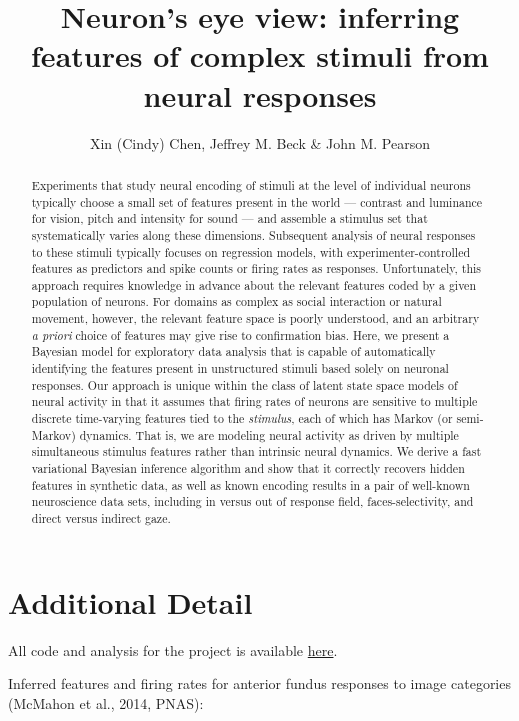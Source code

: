 \documentclass[12pt]{article}
\title{Neuron's eye view: inferring features of complex stimuli from neural responses}
\author{Xin (Cindy) Chen, Jeffrey M. Beck & John M. Pearson}
\date{}
\begin{document}
\maketitle

\begin{abstract}
    Experiments that study neural encoding of stimuli at the level of individual neurons typically choose a small set of features present in the world --- contrast and luminance for vision, pitch and intensity for sound --- and assemble a stimulus set that systematically varies along these dimensions. Subsequent analysis of neural responses to these stimuli typically focuses on regression models, with experimenter-controlled features as predictors and spike counts or firing rates as responses. Unfortunately, this approach requires knowledge in advance about the relevant features coded by a given population of neurons. For domains as complex as social interaction or natural movement, however, the relevant feature space is poorly understood, and an arbitrary \emph{a priori} choice of features may give rise to confirmation bias. Here, we present a Bayesian model for exploratory data analysis that is capable of automatically identifying the features present in unstructured stimuli based solely on neuronal responses. Our approach is unique within the class of latent state space models of neural activity in that it assumes that firing rates of neurons are sensitive to multiple discrete time-varying features tied to the \emph{stimulus}, each of which has Markov (or semi-Markov) dynamics. That is, we are modeling neural activity as driven by multiple simultaneous stimulus features rather than intrinsic neural dynamics.  We derive a fast variational Bayesian inference algorithm and show that it correctly recovers hidden features in synthetic data, as well as known encoding results in a pair of well-known neuroscience data sets, including in versus out of response field, faces-selectivity, and direct versus indirect gaze.
\end{abstract}

\section*{Additional Detail}

All code and analysis for the project is available \href{https://github.com/pearsonlab/spiketopics}{here}.

\vspace{5mm}

\noindent Inferred features and firing rates for anterior fundus responses to image categories (McMahon et al., 2014, PNAS):
\end{document}

